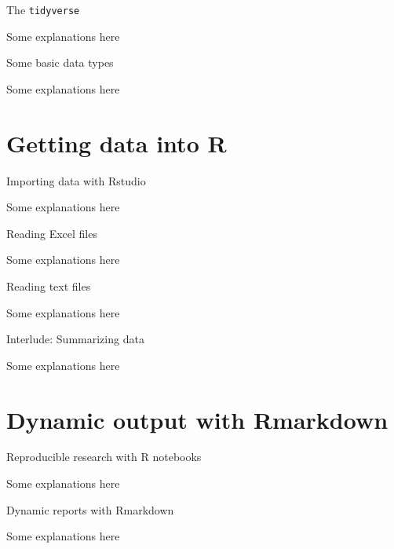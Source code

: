 \documentclass[ignorenonframetext,]{beamer}
\begin{document}
\begin{frame}{The \texttt{tidyverse}}

Some explanations here

\end{frame}

\begin{frame}{Some basic data types}

Some explanations here

\end{frame}

\section{Getting data into R}\label{getting-data-into-r}

\begin{frame}{Importing data with Rstudio}

Some explanations here

\end{frame}

\begin{frame}{Reading Excel files}

Some explanations here

\end{frame}

\begin{frame}{Reading text files}

Some explanations here

\end{frame}

\begin{frame}{Interlude: Summarizing data}

Some explanations here

\end{frame}

\section{Dynamic output with
Rmarkdown}\label{dynamic-output-with-rmarkdown}

\begin{frame}{Reproducible research with R notebooks}

Some explanations here

\end{frame}

\begin{frame}{Dynamic reports with Rmarkdown}

Some explanations here

\end{frame}
\end{document}
